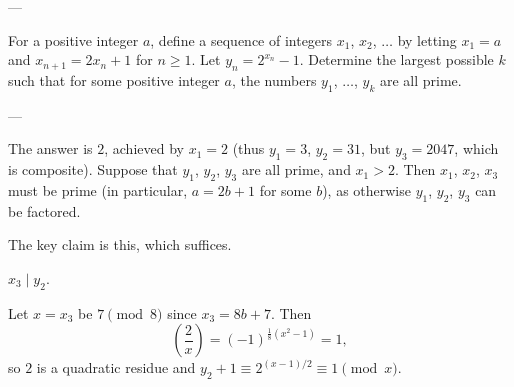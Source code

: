 
---

For a positive integer $a$, define a sequence of integers $x_1$, $x_2$, $\ldots$ by letting $x_1=a$ and $x_{n+1}=2x_n+1$ for $n\ge1$. Let $y_n=2^{x_n}-1$. Determine the largest possible $k$ such that for some positive integer $a$, the numbers $y_1$, $\ldots$, $y_k$ are all prime.

---

The answer is $2$, achieved by $x_1=2$ (thus $y_1=3$, $y_2=31$, but $y_3=2047$, which is composite). Suppose that $y_1$, $y_2$, $y_3$ are all prime, and $x_1>2$. Then $x_1$, $x_2$, $x_3$ must be prime (in particular, $a=2b+1$ for some $b$), as otherwise $y_1$, $y_2$, $y_3$ can be factored.

The key claim is this, which suffices.
\begin{iclaim*}
    $x_3\mid y_2$.
\end{iclaim*}
Let $x=x_3$ be $7\pmod8$ since $x_3=8b+7$. Then \[\left(\frac2x\right)=(-1)^{\frac18(x^2-1)}=1,\]
so $2$ is a quadratic residue and $y_2+1\equiv2^{(x-1)/2}\equiv1\pmod x$.

